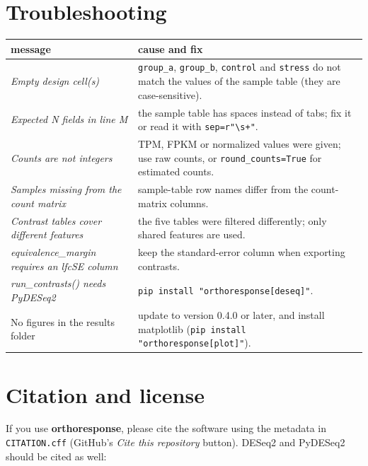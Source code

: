 \documentclass[11pt,a4paper]{article}
\newcommand{\code}[1]{\texttt{\color{navy!85!black}#1}}
\newcommand{\pkg}{\textsf{\bfseries orthoresponse}}
\begin{document}
\section{Troubleshooting}

\begin{center}
\small
\begin{tabularx}{\linewidth}{>{\raggedright\arraybackslash}p{5.2cm} Y}
\toprule
\textsf{\textbf{message}} & \textsf{\textbf{cause and fix}}\\
\midrule
\emph{Empty design cell(s)} & \code{group\_a}, \code{group\_b}, \code{control} and \code{stress} do not match
the values of the sample table (they are case-sensitive).\\
\emph{Expected N fields in line M} & the sample table has spaces instead of tabs; fix it or read it with
\code{sep=r"\textbackslash{}s+"}.\\
\emph{Counts are not integers} & TPM, FPKM or normalized values were given; use raw counts, or
\code{round\_counts=True} for estimated counts.\\
\emph{Samples missing from the count matrix} & sample-table row names differ from the count-matrix columns.\\
\emph{Contrast tables cover different features} & the five tables were filtered differently; only shared
features are used.\\
\emph{equivalence\_margin requires an lfcSE column} & keep the standard-error column when exporting contrasts.\\
\emph{run\_contrasts() needs PyDESeq2} & \code{pip install "orthoresponse[deseq]"}.\\
No figures in the results folder & update to version 0.4.0 or later, and install matplotlib
(\code{pip install "orthoresponse[plot]"}).\\
\bottomrule
\end{tabularx}
\end{center}

\section{Citation and license}

If you use \pkg{}, please cite the software using the metadata in \code{CITATION.cff}
(GitHub's \emph{Cite this repository} button). DESeq2 and PyDESeq2 should be cited as well:
\end{document}
